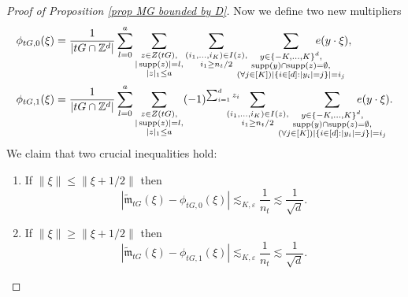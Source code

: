 \documentclass[a4paper,oneside, reqno]{amsart}
\numberwithin{equation}{section}
\theoremstyle{definition}%
\theoremstyle{definition}
\theoremstyle{definition}%
\theoremstyle{definition}
\newcommand{\Z}{\mathbb{Z}}
\DeclareMathOperator{\supp}{supp}
\begin{document}
\begin{proof}[Proof of Proposition \ref{prop MG bounded by D}]
Now we define two new multipliers
\begin{align*}
\phi_{tG,0}(\xi)&=\frac{1}{|tG \cap \Z^d|} \sum_{l=0}^a \sum_{\substack{z \in Z(tG),
\\ |\supp(z)|=l, \\ |z|_1 \le a
}}  \sum_{\substack{(i_1,...,i_K) \in I(z), \\
i_1 \geq n_t/2
}} 
\hspace{-0.4cm}\sum_{\substack{y \in \{-K,...,K\}^d, 
\\ \supp(y) \cap \supp(z)= \emptyset, 
\\
(\forall j \in [K]) |\{i \in [d]: |y_i|=j\}|=i_j
}} \hspace{-1cm}e(y \cdot \xi),
\\
\phi_{tG,1}(\xi)&=\frac{1}{|tG \cap \Z^d|} \sum_{l=0}^a \sum_{\substack{z \in Z(tG),
\\ |\supp(z)|=l, \\ |z|_1 \le a
}} (-1)^{\sum_{i=1}^d z_i} \hspace{-0.5cm}\sum_{\substack{(i_1,...,i_K) \in I(z), \\
i_1 \geq n_t/2
}} 
\hspace{-0.4cm}\sum_{\substack{y \in \{-K,...,K\}^d, 
\\ \supp(y) \cap \supp(z)= \emptyset, 
\\
(\forall j \in [K]) |\{i \in [d]: |y_i|=j\}|=i_j
}} \hspace{-1cm} e(y \cdot \xi).
\end{align*}
We claim that two crucial inequalities hold:
\begin{enumerate} \item If $\| \xi \| \leq \| \xi+ 1/2 \|$ then
\begin{equation} \label{eq:4.1}
|\widetilde{\mathfrak{m}}_{tG}(\xi)-\phi_{tG,0}(\xi)| \lesssim_{K,\varepsilon} \frac{1}{n_t}\lesssim \frac{1}{\sqrt{d}}.
\end{equation}
\item  If $\| \xi \| \geq \| \xi+ 1/2 \|$ then
\begin{equation} \label{eq:4.2}
|\widetilde{\mathfrak{m}}_{tG}(\xi)-\phi_{tG,1}(\xi)| \lesssim_{K,\varepsilon} \frac{1}{n_t} \lesssim \frac{1}{\sqrt{d}}.
\end{equation}
\end{enumerate}


\end{proof}
\end{document}
